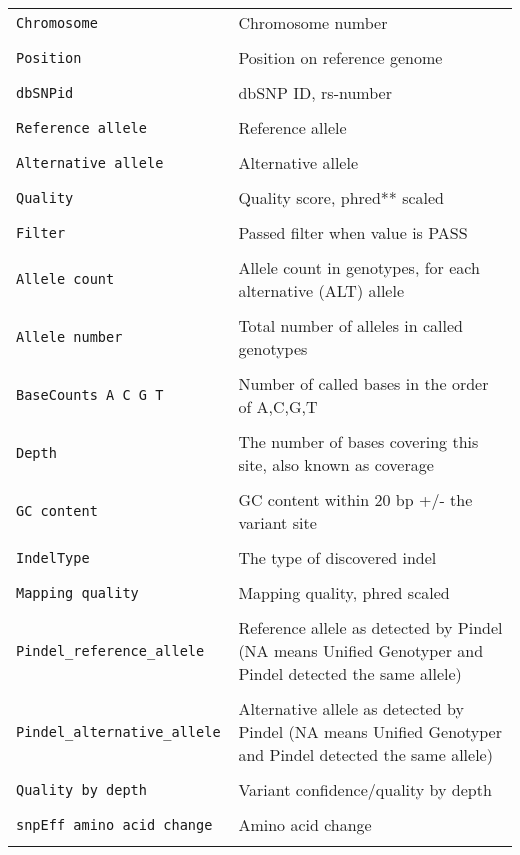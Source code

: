 \documentclass[a4paper,12pt]{article}
\begin{document}
\begin{center}
\begin{longtable}{p{5cm} p{8cm}}
	\tt{Chromosome} & Chromosome number \\\\
	\tt{Position} & Position on reference genome \\\\
	\tt{dbSNPid} & dbSNP ID, rs-number \\\\
	\tt{Reference allele} & Reference allele \\\\
	\tt{Alternative allele} & Alternative allele \\\\
	\tt{Quality} & Quality score, phred** scaled \\\\
	\tt{Filter} & Passed filter when value is PASS \\\\
	\tt{Allele count} & Allele count in genotypes, for each alternative (ALT) allele \\\\
	\tt{Allele number} & Total number of alleles in called genotypes \\\\
	\tt{BaseCounts A C G T} & Number of called bases in the order of A,C,G,T \\\\
	\tt{Depth} & The number of bases covering this site, also known as coverage \\\\
	\tt{GC content} & GC content within 20 bp +/- the variant site \\\\
	\tt{IndelType} & The type of discovered indel \\\\
	\tt{Mapping quality} & Mapping quality, phred scaled \\\\
	\tt{Pindel_reference_allele} & Reference allele as detected by Pindel (NA means Unified Genotyper and Pindel detected the same allele) \\\\
	\tt{Pindel_alternative_allele} & Alternative allele as detected by Pindel (NA means Unified Genotyper and Pindel detected the same allele) \\\\
	\tt{Quality by depth} & Variant confidence/quality by depth \\\\
	\tt{snpEff amino acid change} & Amino acid change \\\\

\end{longtable}
\end{center}
\end{document}
